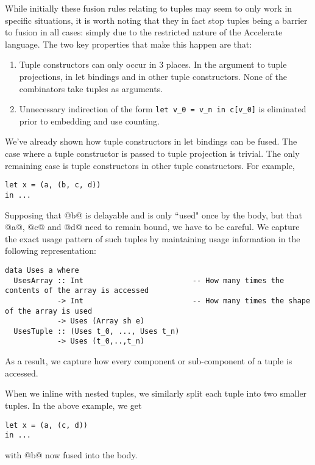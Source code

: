 
While initially these fusion rules relating to tuples may seem to only work in specific situations, it is worth noting that they in fact stop tuples being a barrier to fusion in all cases: simply due to the restricted nature of the Accelerate language. The two key properties that make this happen are that:
\begin{enumerate}
\item Tuple constructors can only occur in 3 places. In the argument to tuple projections, in let bindings and in other tuple constructors. None of the combinators take tuples as arguments.
\item Unnecessary indirection of the form \lstinline[style=ndp]{let v_0 = v_n in c[v_0]} is eliminated prior to embedding and use counting.
\end{enumerate}
%
We've already shown how tuple constructors in let bindings can be fused. The case where a tuple constructor is passed to tuple projection is trivial. The only remaining case is tuple constructors in other tuple constructors. For example,
%
\begin{lstlisting}
let x = (a, (b, c, d))
in ...
\end{lstlisting}
%
Supposing that @b@ is delayable and is only ``used" once by the body, but that @a@, @c@ and @d@ need to remain bound, we have to be careful. We capture the exact usage pattern of such tuples by maintaining usage information in the following representation:
%
\begin{lstlisting}
data Uses a where
  UsesArray :: Int                         -- How many times the contents of the array is accessed
            -> Int                         -- How many times the shape of the array is used
            -> Uses (Array sh e)
  UsesTuple :: (Uses t_0, ..., Uses t_n)
            -> Uses (t_0,..,t_n)
\end{lstlisting}
%
As a result, we capture how every component or sub-component of a tuple is accessed.

When we inline with nested tuples, we similarly split each tuple into two smaller tuples. In the above example, we get
%
\begin{lstlisting}
let x = (a, (c, d))
in ...
\end{lstlisting}
%
with @b@ now fused into the body.


